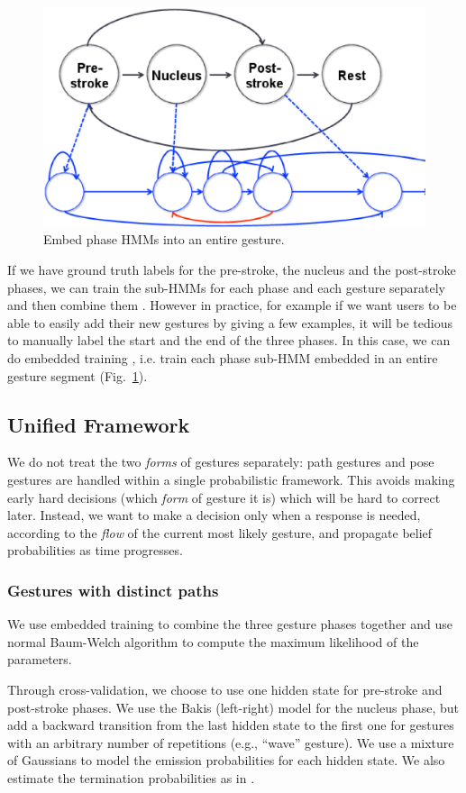 \documentclass[conference]{IEEEtran}
\begin{document}
\begin{figure}[!t]
\centering
\includegraphics[width=0.7\columnwidth]{fig/embedded.ps}
\caption{Embed phase HMMs into an entire gesture.}
\label{fig:embed}
\end{figure}

If we have ground truth labels for the pre-stroke, the nucleus and the
post-stroke phases, we can train the sub-HMMs for each phase and each gesture
separately and then combine them \cite{yin13}. However in practice, for example
if we want users to be able to easily add their new gestures by giving a few
examples, it will be tedious to manually label the start and the end of the
three phases. In this case, we can do embedded training \cite{young1994}, i.e.
train each phase sub-HMM embedded in an entire gesture segment
(Fig.~\ref{fig:embed}).

\subsection{Unified Framework}\label{sec:unified}
We do not treat the two \textit{forms} of gestures separately: path gestures
and pose gestures are handled within a
single probabilistic framework. This avoids making early hard decisions (which
\textit{form} of gesture it is) which will be hard to correct later. Instead, we
want to make a decision only when a response is needed, according to the
\textit{flow} of the current most likely gesture, and propagate belief 
probabilities as time progresses.

\subsubsection{Gestures with distinct paths}
We use embedded training to
combine the three gesture phases together and use normal Baum-Welch algorithm to compute the
maximum likelihood of the parameters. 

Through cross-validation, we choose to use one hidden state for pre-stroke and
post-stroke phases. We use the Bakis (left-right) model \cite{Bauer00} for the
nucleus phase, but add a backward transition from the last hidden state to the first
one for gestures with an arbitrary number of repetitions (e.g., ``wave''
gesture). We use a mixture of Gaussians to model the emission probabilities for
each hidden state. We also estimate the termination
probabilities as in \cite{yin13}.
\end{document}
